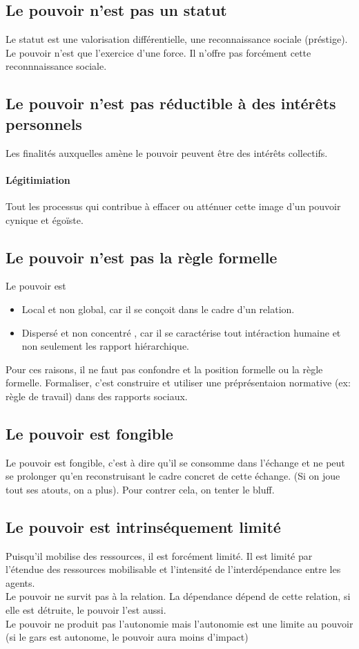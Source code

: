 \documentclass[11pt]{article} %
\begin{document}
	\subsection{Le pouvoir n'est pas un statut}
		Le statut est une valorisation différentielle, une reconnaissance sociale (préstige). Le pouvoir n'est que 
		l'exercice d'une force. Il n'offre pas forcément cette reconnnaissance sociale.
	\subsection{Le pouvoir n'est pas réductible à des intérêts personnels}
		Les finalités auxquelles amène le pouvoir peuvent être des intérêts collectifs.
		\paragraph{Légitimiation} Tout les processus qui contribue à effacer ou atténuer cette image d'un
		pouvoir cynique et égoïste.
	\subsection{Le pouvoir n'est pas la règle formelle}
		Le pouvoir est
		\begin{itemize}
			\item Local et non global, car il se conçoit dans le cadre d'un relation.
			\item Dispersé et non concentré , car il se caractérise tout intéraction humaine et non 
			seulement les rapport hiérarchique.
		\end{itemize}
		Pour ces raisons, il ne faut pas confondre et la position formelle ou la règle formelle. Formaliser, c'est
		construire et utiliser une préprésentaion normative (ex: règle de travail) dans des rapports sociaux.
	\subsection{Le pouvoir est fongible}
		Le pouvoir est fongible, c'est à dire qu'il se consomme dans l'échange et ne peut se prolonger qu'en
		reconstruisant le cadre concret de cette échange. (Si on joue tout ses atouts, on a plus).
		Pour contrer cela, on tenter le bluff.
	\subsection{Le pouvoir est intrinséquement limité}
		Puisqu'il mobilise des ressources, il est forcément limité. Il est limité par l'étendue des ressources 
		mobilisable et l'intensité de l'interdépendance entre les agents.\\
		Le pouvoir ne survit pas à la relation. La dépendance dépend de cette relation, si elle est détruite, le 
		pouvoir l'est aussi. \\
		Le pouvoir ne produit pas l'autonomie mais l'autonomie est une limite au pouvoir (si le gars est 
		autonome, le pouvoir aura moins d'impact)
\end{document}
